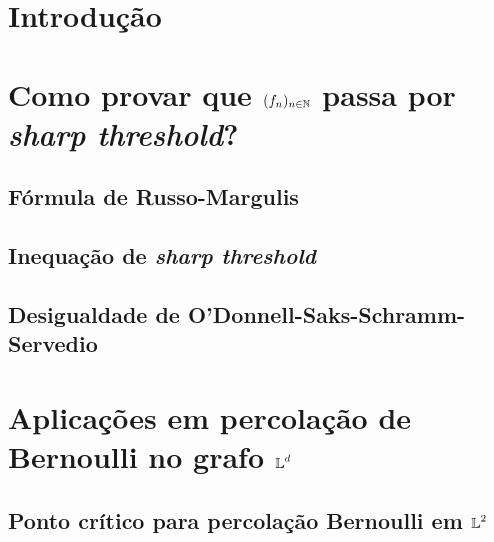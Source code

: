 \newpage
\pagestyle{main}

\section{Introdução}\label{Intoduction} \vspace{24pt} 



\section{Como provar que $(f_n)_{n \in \operatorname{\mathbb{N}}}$ passa por \textit{sharp threshold}?}\label{How-to-prove} \vspace{24pt}



\subsection{Fórmula de Russo-Margulis}



\subsection{Inequação de \textit{sharp threshold}}



\subsection{Desigualdade de O'Donnell-Saks-Schramm-Servedio} \label{subsection-OSSS}



\section{Aplicações em percolação de Bernoulli no grafo $\operatorname{\mathbb{L}}^d$} \label{Bernoulli-percolation} \vspace{24pt}



\subsection{Ponto crítico para percolação Bernoulli em $\operatorname{\mathbb{L}}^2$}


